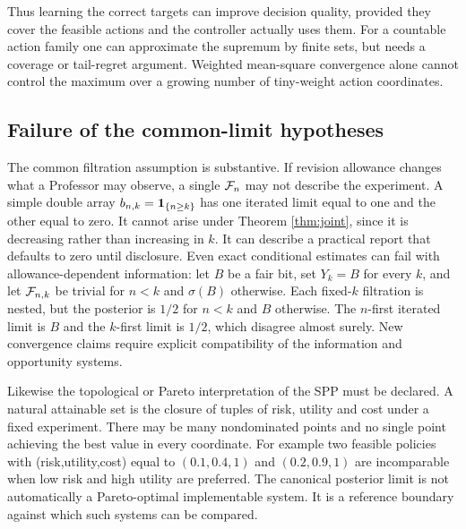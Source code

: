 \documentclass[11pt]{article}
\begin{document}
Thus learning the correct targets can improve decision quality, provided they cover the feasible actions and the controller actually uses them. For a countable action family one can approximate the supremum by finite sets, but needs a coverage or tail-regret argument. Weighted mean-square convergence alone cannot control the maximum over a growing number of tiny-weight action coordinates.

\subsection{Failure of the common-limit hypotheses}
The common filtration assumption is substantive. If revision allowance changes what a Professor may observe, a single $\mathcal F_n$ may not describe the experiment. A simple double array $b_{n,k}=\mathbf 1_{\{n\geq k\}}$ has one iterated limit equal to one and the other equal to zero. It cannot arise under Theorem \ref{thm:joint}, since it is decreasing rather than increasing in $k$. It can describe a practical report that defaults to zero until disclosure. Even exact conditional estimates can fail with allowance-dependent information: let $B$ be a fair bit, set $Y_k=B$ for every $k$, and let $\mathcal F_{n,k}$ be trivial for $n<k$ and $\sigma(B)$ otherwise. Each fixed-$k$ filtration is nested, but the posterior is $1/2$ for $n<k$ and $B$ otherwise. The $n$-first iterated limit is $B$ and the $k$-first limit is $1/2$, which disagree almost surely. New convergence claims require explicit compatibility of the information and opportunity systems.

Likewise the topological or Pareto interpretation of the SPP must be declared. A natural attainable set is the closure of tuples of risk, utility and cost under a fixed experiment. There may be many nondominated points and no single point achieving the best value in every coordinate. For example two feasible policies with (risk,utility,cost) equal to $(0.1,0.4,1)$ and $(0.2,0.9,1)$ are incomparable when low risk and high utility are preferred. The canonical posterior limit is not automatically a Pareto-optimal implementable system. It is a reference boundary against which such systems can be compared.
\end{document}

